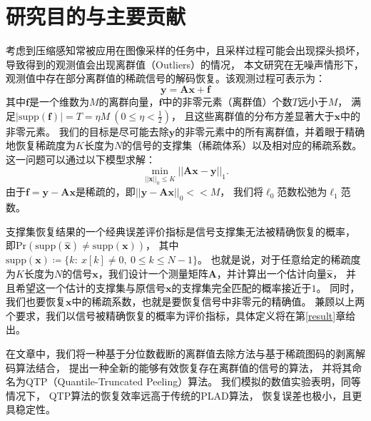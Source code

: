 \documentclass[AutoFakeBold]{LZUThesis}
\begin{document}
\section{研究目的与主要贡献}

考虑到压缩感知常被应用在图像采样的任务中，且采样过程可能会出现探头损坏，导致得到的观测值会出现离群值（Outliers）的情况，
本文研究在无噪声情形下，观测值中存在部分离群值的稀疏信号的解码恢复。该观测过程可表示为：
\begin{equation}
    \mathbf{y} = \mathbf{Ax} + \mathbf{f}
\end{equation}
其中$\mathbf{f}$是一个维数为$M$的离群向量，$\mathbf{f}$中的非零元素（离群值）个数$T$远小于$M$，
满足$\left | \mathrm{supp} (\mathbf{f}) \right | = T = \eta M \ (0 \leq \eta < \frac{1}{2})$，
且这些离群值的分布方差显著大于$\mathbf{x}$中的非零元素。
我们的目标是尽可能去除$\mathbf{y}$的非零元素中的所有离群值，并着眼于精确地恢复稀疏度为$K$长度为$N$的信号的支撑集（稀疏体系）以及相对应的稀疏系数。
这一问题可以通过以下模型求解：
\begin{equation}\tag{$*$}
    \min_{||\mathbf{x}||_0 \leq K}{||\mathbf{Ax} - \mathbf{y}||_1}. 
    \label{model}
\end{equation}
由于$\mathbf{f} = \mathbf{y} - \mathbf{Ax}$是稀疏的，即$||\mathbf{y} - \mathbf{Ax}||_0 << M$，
我们将$\ell_0$范数松弛为$\ell_1$范数。

支撑集恢复结果的一个经典误差评价指标是信号支撑集无法被精确恢复的概率，
即$\mathrm{Pr}(\mathrm{supp}(\hat{\mathbf{x}}) \neq \mathrm{supp}(\mathbf{x}))$，
其中$\mathrm{supp}(\mathbf{x}) \coloneq \{k:\ x[k] \neq 0,\ 0 \leq k \leq N-1\}$。
也就是说，对于任意给定的稀疏度为$K$长度为$N$的信号$\mathbf{x}$，我们设计一个测量矩阵$\mathbf{A}$，并计算出一个估计向量$\hat{\mathbf{x}}$，
并且希望这一个估计的支撑集与原信号$\mathbf{x}$的支撑集完全匹配的概率接近于$1$。
同时，我们也要恢复$\mathbf{x}$中的稀疏系数，也就是要恢复信号中非零元的精确值。
兼顾以上两个要求，我们以信号被精确恢复的概率为评价指标，具体定义将在第\ref{result}章给出。

在文章中，我们将一种基于分位数截断的离群值去除方法与基于稀疏图码的剥离解码算法结合，
提出一种全新的能够有效恢复存在离群值的信号的算法，
并将其命名为QTP（Quantile-Truncated Peeling）算法。
我们模拟的数值实验表明，同等情况下，
QTP算法的恢复效率远高于传统的PLAD算法，
恢复误差也极小，且更具稳定性。
\end{document}
